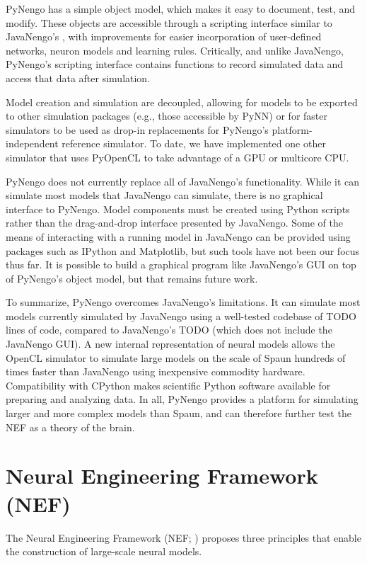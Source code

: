 \documentclass{frontiersSCNS}
\begin{document}
PyNengo has a simple object model,
which makes it easy to
document, test, and modify.
These objects are accessible
through a scripting interface
similar to JavaNengo's \citep{stewart2009},
with improvements
for easier incorporation of user-defined networks,
neuron models and learning rules.
Critically, and unlike JavaNengo,
PyNengo's scripting interface
contains functions to record simulated data
and access that data after simulation.

Model creation and simulation are decoupled,
allowing for models to be exported
to other simulation packages
(e.g., those accessible by PyNN)
or for faster simulators to be used
as drop-in replacements for PyNengo's
platform-independent reference simulator.
To date, we have implemented one other simulator
that uses PyOpenCL to take advantage
of a GPU or multicore CPU.

PyNengo does not currently
replace all of JavaNengo's functionality.
While it can simulate most
models that JavaNengo can simulate,
there is no graphical interface to PyNengo.
Model components must be created
using Python scripts rather than
the drag-and-drop interface presented by JavaNengo.
Some of the means of interacting
with a running model in JavaNengo
can be provided using packages
such as IPython and Matplotlib,
but such tools have not been our focus thus far.
It is possible to build a graphical program
like JavaNengo's GUI on top of PyNengo's object model,
but that remains future work.

To summarize, PyNengo overcomes
JavaNengo's limitations.
It can simulate most models
currently simulated by JavaNengo
using a well-tested codebase of
TODO lines of code,
compared to JavaNengo's TODO
(which does not include the JavaNengo GUI).
A new internal representation of neural models
allows the OpenCL simulator to simulate
large models on the scale of Spaun
hundreds of times faster than JavaNengo
using inexpensive commodity hardware.
Compatibility with CPython makes scientific Python software
available for preparing and analyzing data.
In all, PyNengo provides a platform for
simulating larger and more complex models than Spaun,
and can therefore further test the NEF
as a theory of the brain.

\section{Neural Engineering Framework (NEF)}

The Neural Engineering Framework (NEF; \citealp{eliasmith2003})
proposes three principles
that enable the construction
of large-scale neural models.
\end{document}
